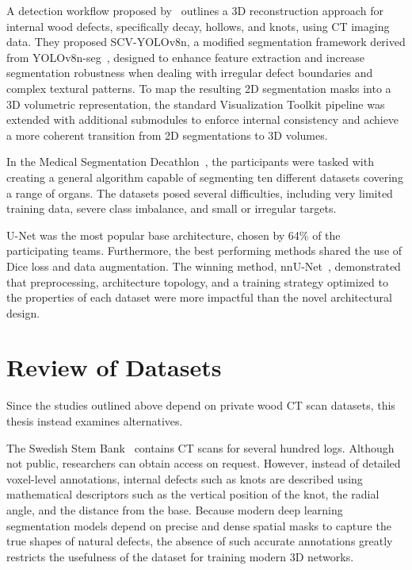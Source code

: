 A detection workflow proposed by~\cite{xie2026deep} outlines a 3D reconstruction approach for internal wood defects, specifically decay, hollows, and knots, using CT imaging data. They proposed SCV-YOLOv8n, a modified segmentation framework derived from YOLOv8n-seg~\cite{yolov8_ultralytics}, designed to enhance feature extraction and increase segmentation robustness when dealing with irregular defect boundaries and complex textural patterns. To map the resulting 2D segmentation masks into a 3D volumetric representation, the standard Visualization Toolkit pipeline was extended with additional submodules to enforce internal consistency and achieve a more coherent transition from 2D segmentations to 3D volumes.


In the Medical Segmentation
Decathlon~\cite{antonelli2022msd}, the participants were
tasked with creating a general algorithm capable of segmenting ten different
datasets covering a range of organs. The datasets posed several difficulties,
including very limited training data,
severe class imbalance, and small or irregular targets.

U-Net was the most popular base architecture, chosen by 64\% of the
participating teams. Furthermore, the best performing methods shared the use of Dice loss and data augmentation. The
winning method, nnU-Net~\cite{antonelli2022msd, isensee2021nnunet},
demonstrated that preprocessing, architecture
topology, and a training strategy optimized to the properties of each dataset were more impactful than the novel architectural design.


\section{Review of Datasets}
Since the studies outlined above depend on private wood CT scan datasets, this thesis instead examines alternatives.

The Swedish Stem Bank~\cite{grundberg1995ssb} contains CT scans for several hundred logs. Although not public, researchers can obtain access on request. However, instead of detailed voxel-level annotations, internal defects such as knots are described using mathematical descriptors such as the vertical position of the knot, the radial angle, and the distance from the base. Because modern deep learning segmentation models depend on precise and dense spatial masks to capture the true shapes of natural defects, the absence of such accurate annotations greatly restricts the usefulness of the dataset for training modern 3D networks.


